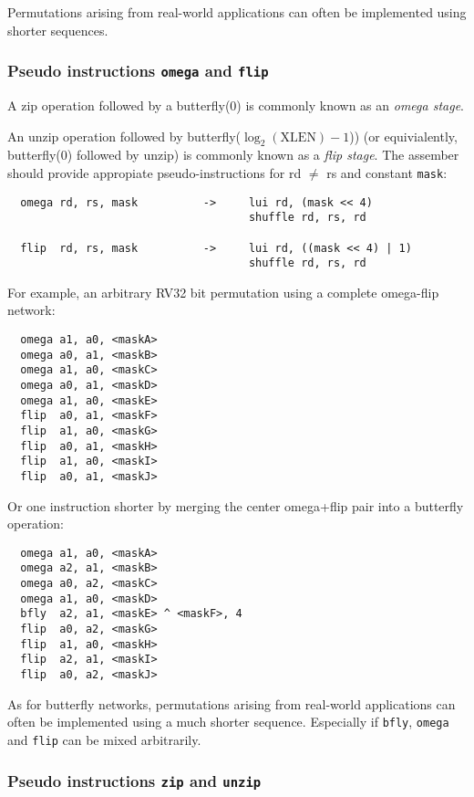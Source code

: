 Permutations arising from real-world applications can often be implemented using
shorter sequences.

\subsubsection{Pseudo instructions {\tt omega} and {\tt flip}}

A zip operation followed by a butterfly(0) is commonly known as an {\it omega stage}.

An unzip operation followed by butterfly($\log_2(\textrm{XLEN})-1$)) (or
equivialently, butterfly(0) followed by unzip) is commonly known as a {\it flip
stage}. The assember should provide appropiate pseudo-instructions for rd
$\neq$ rs and constant {\tt mask}:

\begin{verbatim}
  omega rd, rs, mask          ->     lui rd, (mask << 4)
                                     shuffle rd, rs, rd

  flip  rd, rs, mask          ->     lui rd, ((mask << 4) | 1)
                                     shuffle rd, rs, rd
\end{verbatim}

For example, an arbitrary RV32 bit permutation using a complete omega-flip network:

\begin{verbatim}
  omega a1, a0, <maskA>
  omega a0, a1, <maskB>
  omega a1, a0, <maskC>
  omega a0, a1, <maskD>
  omega a1, a0, <maskE>
  flip  a0, a1, <maskF>
  flip  a1, a0, <maskG>
  flip  a0, a1, <maskH>
  flip  a1, a0, <maskI>
  flip  a0, a1, <maskJ>
\end{verbatim}

Or one instruction shorter by merging the center omega+flip pair into a
butterfly operation:

\begin{verbatim}
  omega a1, a0, <maskA>
  omega a2, a1, <maskB>
  omega a0, a2, <maskC>
  omega a1, a0, <maskD>
  bfly  a2, a1, <maskE> ^ <maskF>, 4
  flip  a0, a2, <maskG>
  flip  a1, a0, <maskH>
  flip  a2, a1, <maskI>
  flip  a0, a2, <maskJ>
\end{verbatim}

As for butterfly networks, permutations arising from real-world applications
can often be implemented using a much shorter sequence. Especially if {\tt bfly},
{\tt omega} and {\tt flip} can be mixed arbitrarily.

\subsubsection{Pseudo instructions {\tt zip} and {\tt unzip}}

